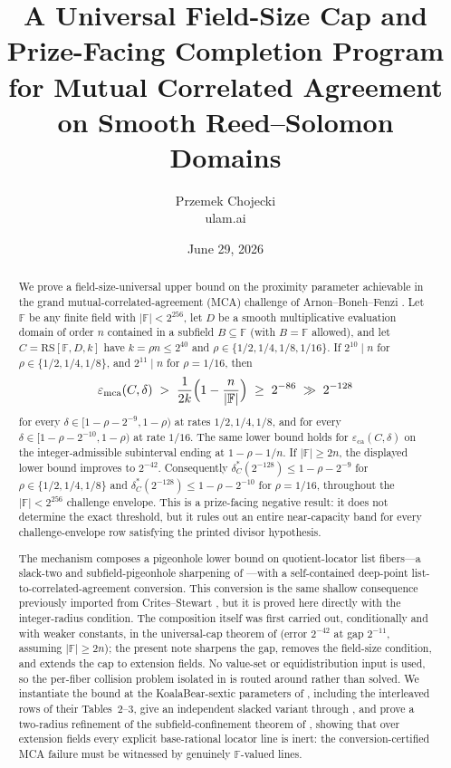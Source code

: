 \documentclass[11pt]{article}
\title{A Universal Field-Size Cap and Prize-Facing Completion Program\\ for Mutual Correlated Agreement on Smooth Reed--Solomon Domains}
\author{Przemek Chojecki\\ \small ulam.ai}
\date{June 29, 2026}
\theoremstyle{definition}
\theoremstyle{remark}
\newcommand{\F}{\mathbb{F}}
\newcommand{\B}{B}
\newcommand{\RS}{\mathrm{RS}}
\newcommand{\eca}{\varepsilon_{\mathrm{ca}}}
\newcommand{\emca}{\varepsilon_{\mathrm{mca}}}
\begin{document}
\maketitle

\begin{abstract}
We prove a field-size-universal upper bound on the proximity parameter achievable in the grand mutual-correlated-agreement (MCA) challenge of Arnon--Boneh--Fenzi \cite{ABF26}. Let $\F$ be any finite field with $|\F|<2^{256}$, let $D$ be a smooth multiplicative evaluation domain of order $n$ contained in a subfield $\B\subseteq\F$ (with $\B=\F$ allowed), and let $C=\RS[\F,D,k]$ have $k=\rho n\le2^{40}$ and $\rho\in\{1/2,1/4,1/8,1/16\}$. If $2^{10}\mid n$ for $\rho\in\{1/2,1/4,1/8\}$, and $2^{11}\mid n$ for $\rho=1/16$, then
\[
\emca(C,\delta)
\;>\;\frac{1}{2k}\Bigl(1-\frac n{|\F|}\Bigr)
\;\ge\;2^{-86}\;\gg\;2^{-128}
\]
for every $\delta\in[1-\rho-2^{-9},1-\rho)$ at rates $1/2,1/4,1/8$, and for every $\delta\in[1-\rho-2^{-10},1-\rho)$ at rate $1/16$. The same lower bound holds for $\eca(C,\delta)$ on the integer-admissible subinterval ending at $1-\rho-1/n$. If $|\F|\ge2n$, the displayed lower bound improves to $2^{-42}$. Consequently $\delta^*_C(2^{-128})\le 1-\rho-2^{-9}$ for $\rho\in\{1/2,1/4,1/8\}$ and $\delta^*_C(2^{-128})\le 1-\rho-2^{-10}$ for $\rho=1/16$, throughout the $|\F|<2^{256}$ challenge envelope. This is a prize-facing negative result: it does not determine the exact threshold, but it rules out an entire near-capacity band for every challenge-envelope row satisfying the printed divisor hypothesis.

The mechanism composes a pigeonhole lower bound on quotient-locator list fibers---a slack-two and subfield-pigeonhole sharpening of \cite[Main Thm.\,(d)]{Cho26a}---with a self-contained deep-point list-to-correlated-agreement conversion. This conversion is the same shallow consequence previously imported from Crites--Stewart \cite[Thm.~2]{CS25}, but it is proved here directly with the integer-radius condition. The composition itself was first carried out, conditionally and with weaker constants, in the universal-cap theorem of \cite{Cho26b} (error $2^{-42}$ at gap $2^{-11}$, assuming $|\F|\ge2n$); the present note sharpens the gap, removes the field-size condition, and extends the cap to extension fields. No value-set or equidistribution input is used, so the per-fiber collision problem isolated in \cite{Cho26b} is routed around rather than solved. We instantiate the bound at the KoalaBear-sextic parameters of \cite[\S6.3]{ABF26}, including the interleaved rows of their Tables~2--3, give an independent slacked variant through \cite[Thm.~1.9]{BCHKS25}, and prove a two-radius refinement of the subfield-confinement theorem of \cite{Cho26b}, showing that over extension fields every explicit base-rational locator line is inert: the conversion-certified MCA failure must be witnessed by genuinely $\F$-valued lines.
\end{abstract}
\end{document}
